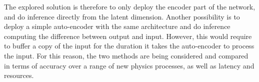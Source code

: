 The explored solution is therefore to only deploy the encoder part of the network, and do inference directly from the latent dimension. Another possibility is to deploy a simple auto-encoder with the same architecture and do inference computing the difference between output and input. 
However, this would require to buffer a copy of the input for the duration it takes the auto-encoder to process the input.
For this reason, the two methods are being considered and compared in terms of accuracy over a range of new physics processes, as well as latency and resources.

